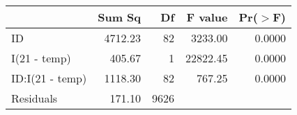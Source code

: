\begin{table}[ht]
\centering
\begin{tabular}{lrrrr}
  \hline
 & Sum Sq & Df & F value & Pr($>$F) \\ 
  \hline
ID & 4712.23 & 82 & 3233.00 & 0.0000 \\ 
  I(21 - temp) & 405.67 & 1 & 22822.45 & 0.0000 \\ 
  ID:I(21 - temp) & 1118.30 & 82 & 767.25 & 0.0000 \\ 
  Residuals & 171.10 & 9626 &  &  \\ 
   \hline
\end{tabular}
\end{table}
